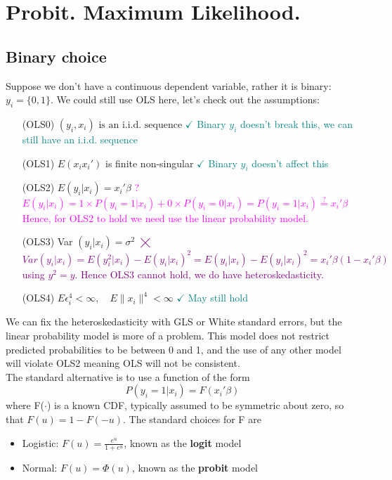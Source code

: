 \documentclass[DIV=14,titlepage=false]{scrreprt}
\begin{document}
\vspace{-10pt}
\setcounter{chapter}{9}
\chapter{Probit. Maximum Likelihood.}
\vspace{-10pt}
\section{Binary choice}
Suppose we don't have a continuous dependent variable, rather it is binary: $y_i = \{0,1\}$. We could still use OLS here, let's check out the assumptions:
\begin{itemize}
    \item [(OLS0)]  $(y_i, x_i)\text{ is an i.i.d. sequence}$
    \subitem \textcolor{teal}{$\checkmark$ Binary $y_i$ doesn't break this, we can still have an i.i.d. sequence}
    \item [(OLS1)] $ E(x_i x_i')$  is finite non-singular
    \subitem \textcolor{teal}{$\checkmark$ Binary $y_i$ doesn't affect this}
    \item [(OLS2)] $E(y_i|x_i) = x_i'\beta$
    \subitem \textcolor{magenta}{? $E(y_i|x_i)=1\times P(y_i=1|x_i)+0\times P(y_i=0|x_i)=P(y_i=1|x_i) \overset{?}{=}x_i'\beta$ 
    \subitem Hence, for OLS2 to hold we need use the linear probability model.}
    \item [(OLS3)] Var $(y_i|x_i)= \sigma^2$
    \subitem \textcolor{purple}{$\bigtimes$ $Var(y_i|x_i) = E(y_i^2|x_i)-E(y_i|x_i)^2=E(y_i|x_i)-E(y_i|x_i)^2=x_i'\beta(1-x_i'\beta)$
    \subitem using $y^2=y$. Hence OLS3 cannot hold, we do have heteroskedasticity.}
    \item [(OLS4)] $E\epsilon_i^4 < \infty, \quad E\|x_i\|^4 < \infty$
    \subitem \textcolor{teal}{$\checkmark$ May still hold}
\end{itemize}
We can fix the heteroskedasticity with GLS or White standard errors, but the linear probability model is more of a problem. This model does not restrict predicted probabilities to be between 0 and 1, and the use of any other model will violate OLS2 meaning OLS will not be consistent.\\
The standard alternative is to use a function of the form \[ P(y_i=1|x_i)=F(x_i'\beta)\] where F($\cdot$) is a known CDF, typically assumed to be symmetric about zero, so that $F(u)=1-F(-u)$. The standard choices for F are
\begin{itemize}
    \item Logistic: $F(u) = \frac{e^u}{1+e^u}$, known as the \textbf{logit} model
    \item Normal: $F(u) = \Phi(u)$, known as the \textbf{probit} model
\end{itemize}
\end{document}
